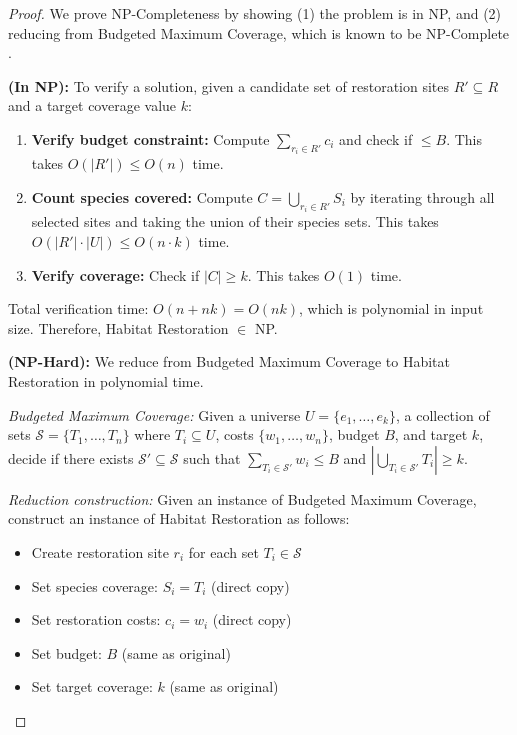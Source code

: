 \documentclass[sigconf,nonacm]{acmart}
\begin{document}
\begin{proof}
We prove NP-Completeness by showing (1) the problem is in NP, and (2) reducing from Budgeted Maximum Coverage, which is known to be NP-Complete \cite{khuller1999budgeted}.

\textbf{(In NP):} To verify a solution, given a candidate set of restoration sites $R' \subseteq R$ and a target coverage value $k$:

\begin{enumerate}
    \item \textbf{Verify budget constraint:} Compute $\sum_{r_i \in R'} c_i$ and check if $\leq B$. This takes $O(|R'|) \leq O(n)$ time.
    \item \textbf{Count species covered:} Compute $C = \bigcup_{r_i \in R'} S_i$ by iterating through all selected sites and taking the union of their species sets. This takes $O(|R'| \cdot |U|) \leq O(n \cdot k)$ time.
    \item \textbf{Verify coverage:} Check if $|C| \geq k$. This takes $O(1)$ time.
\end{enumerate}

Total verification time: $O(n + nk) = O(nk)$, which is polynomial in input size. Therefore, Habitat Restoration $\in$ NP.

\textbf{(NP-Hard):} We reduce from Budgeted Maximum Coverage to Habitat Restoration in polynomial time.

\textit{Budgeted Maximum Coverage:} Given a universe $U = \{e_1, \ldots, e_k\}$, a collection of sets $\mathcal{S} = \{T_1, \ldots, T_n\}$ where $T_i \subseteq U$, costs $\{w_1, \ldots, w_n\}$, budget $B$, and target $k$, decide if there exists $\mathcal{S}' \subseteq \mathcal{S}$ such that $\sum_{T_i \in \mathcal{S}'} w_i \leq B$ and $|\bigcup_{T_i \in \mathcal{S}'} T_i| \geq k$.

\textit{Reduction construction:} Given an instance of Budgeted Maximum Coverage, construct an instance of Habitat Restoration as follows:
\begin{itemize}
    \item Create restoration site $r_i$ for each set $T_i \in \mathcal{S}$
    \item Set species coverage: $S_i = T_i$ (direct copy)
    \item Set restoration costs: $c_i = w_i$ (direct copy)
    \item Set budget: $B$ (same as original)
    \item Set target coverage: $k$ (same as original)
\end{itemize}


\end{proof}
\end{document}
